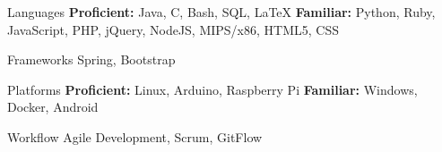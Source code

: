 
\vspace{0mm}
\begin{cvskills}

  \vspace{0mm}

  \cvskill
    {Languages} %
    {\textbf{Proficient:} Java, C, Bash, SQL, LaTeX \newline \textbf{Familiar:} Python, Ruby, JavaScript, PHP, jQuery, NodeJS, MIPS/x86, HTML5, CSS} %

  \vspace{0mm}

  \cvskill
    {Frameworks} %
    {Spring, Bootstrap} %

  \vspace{0mm}

  \cvskill
    {Platforms} %
    {\textbf{Proficient:} Linux, Arduino, Raspberry Pi \newline \textbf{Familiar:} Windows, Docker, Android} %

  \vspace{0mm}

  \cvskill
    {Workflow} %
    {Agile Development, Scrum, GitFlow} %

  \vspace{-4mm}

\end{cvskills}
